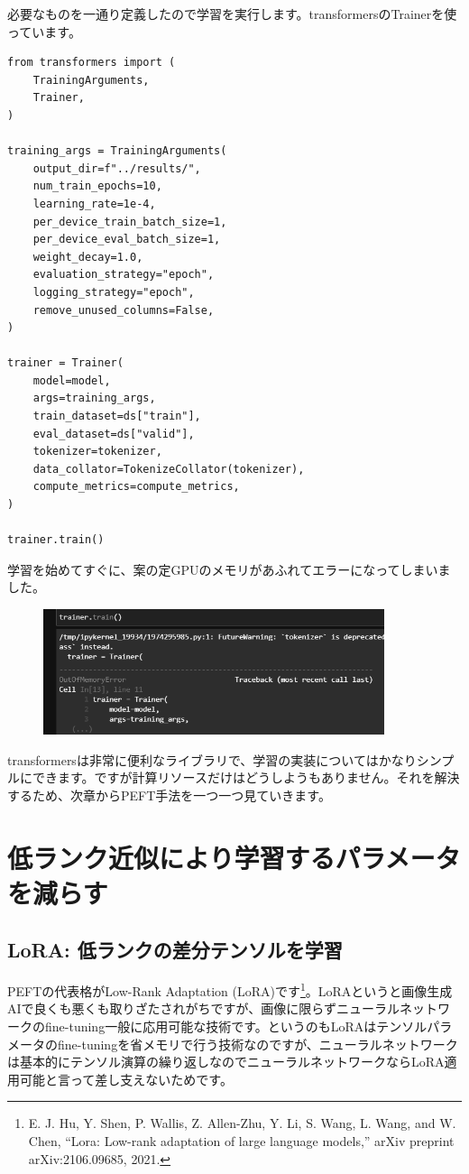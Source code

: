 \documentclass[a5paper,twoside,dvipdfmx]{jsarticle}
\begin{document}
必要なものを一通り定義したので学習を実行します。transformersのTrainerを使っています。

\begin{lstlisting}
from transformers import (
    TrainingArguments,
    Trainer,
)

training_args = TrainingArguments(
    output_dir=f"../results/",
    num_train_epochs=10,
    learning_rate=1e-4,
    per_device_train_batch_size=1,
    per_device_eval_batch_size=1,
    weight_decay=1.0,
    evaluation_strategy="epoch",
    logging_strategy="epoch",
    remove_unused_columns=False,
)

trainer = Trainer(
    model=model,
    args=training_args,
    train_dataset=ds["train"],
    eval_dataset=ds["valid"],
    tokenizer=tokenizer,
    data_collator=TokenizeCollator(tokenizer),
    compute_metrics=compute_metrics,
)

trainer.train()
\end{lstlisting}

学習を始めてすぐに、案の定GPUのメモリがあふれてエラーになってしまいました。

\begin{figure}[h]
  \centering
  \includegraphics[width=100mm]{../C105Fig/gray/ft_oom.png}
 \end{figure} 

transformersは非常に便利なライブラリで、学習の実装についてはかなりシンプルにできます。ですが計算リソースだけはどうしようもありません。それを解決するため、次章からPEFT手法を一つ一つ見ていきます。

\newpage

\section{低ランク近似により学習するパラメータを減らす}

\subsection{LoRA: 低ランクの差分テンソルを学習}

PEFTの代表格がLow-Rank Adaptation (\textsf{LoRA})です\footnote{E. J. Hu, Y. Shen, P. Wallis, Z. Allen-Zhu, Y. Li, S. Wang, L. Wang, and W. Chen, “Lora: Low-rank adaptation of large language models,” arXiv preprint arXiv:2106.09685, 2021.}。LoRAというと画像生成AIで良くも悪くも取りざたされがちですが、画像に限らずニューラルネットワークのfine-tuning一般に応用可能な技術です。というのもLoRAはテンソルパラメータのfine-tuningを省メモリで行う技術なのですが、ニューラルネットワークは基本的にテンソル演算の繰り返しなのでニューラルネットワークならLoRA適用可能と言って差し支えないためです。
\end{document}
